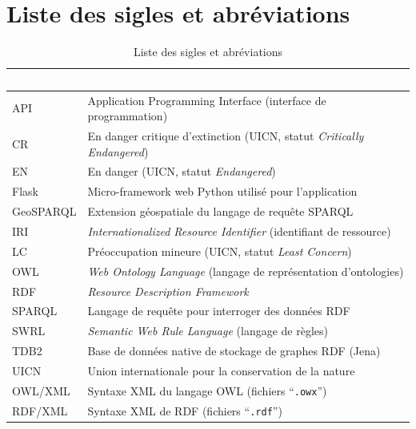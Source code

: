 ﻿\documentclass[12pt,a4paper]{report}
\newcommand{\tete}[1]{\cellcolor{bleu}\textcolor{white}{\bfseries #1}}
\begin{document}

\tableofcontents
\listoffigures
\listoftables

\chapter*{Liste des sigles et abréviations}
\renewcommand{\thetable}{\arabic{table}}
\begin{table}[H]
\centering
\caption{Liste des sigles et abréviations}
\begin{tabular}{@{}p{3.4cm}p{11.6cm}@{}}
\hline
\tete{Sigle} & \tete{Signification} \\
\hline
\rowcolor{grisfond} API & Application Programming Interface (interface de programmation) \\
\rowcolor{grisfond} CR & En danger critique d'extinction (UICN, statut \textit{Critically Endangered}) \\
\rowcolor{grisfond} EN & En danger (UICN, statut \textit{Endangered}) \\
\rowcolor{grisfond} Flask & Micro-framework web Python utilisé pour l'application \\
\rowcolor{grisfond} GeoSPARQL & Extension géospatiale du langage de requête SPARQL \\
\rowcolor{grisfond} IRI & \textit{Internationalized Resource Identifier} (identifiant de ressource) \\
\rowcolor{grisfond} LC & Préoccupation mineure (UICN, statut \textit{Least Concern}) \\
\rowcolor{grisfond} OWL & \textit{Web Ontology Language} (langage de représentation d'ontologies) \\
\rowcolor{grisfond} RDF & \textit{Resource Description Framework} \\
\rowcolor{grisfond} SPARQL & Langage de requête pour interroger des données RDF \\
\rowcolor{grisfond} SWRL & \textit{Semantic Web Rule Language} (langage de règles) \\
\rowcolor{grisfond} TDB2 & Base de données native de stockage de graphes RDF (Jena) \\
\rowcolor{grisfond} UICN & Union internationale pour la conservation de la nature \\
\rowcolor{grisfond} OWL/XML & Syntaxe XML du langage OWL (fichiers ``\texttt{.owx}'') \\
\rowcolor{grisfond} RDF/XML & Syntaxe XML de RDF (fichiers ``\texttt{.rdf}'') \\
\hline
\end{tabular}
\end{table}
\renewcommand{\thetable}{\thechapter.\arabic{table}}
\end{document}
